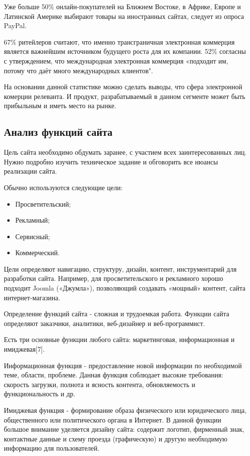Уже больше 50\% онлайн-покупателей на Ближнем Востоке, в Африке, Европе и Латинской Америке выбирают товары на иностранных сайтах, следует из опроса PayPal.

67\% ритейлеров считают, что именно трансграничная электронная коммерция является важнейшим источником будущего роста для их компании.
52\% согласны с утверждением, что международная электронная коммерция «подходит им, потому что даёт много международных клиентов".

На основании данной статистике можно сделать выводы, что сфера электронной комерции релеванта.
И продукт, разрабатываемый в данном сегменте может быть прибыльным и иметь место на рынке.

\subsection{Анализ функций сайта}
Цель сайта необходимо обдумать заранее, с участием всех заинтересованных лиц.
Нужно подробно изучить техническое задание и обговорить все нюансы реализации сайта.

Обычно используются следующие цели:
\begin{itemize}
  \item Просветительский;
  \item Рекламный;
  \item Сервисный;
  \item Коммерческий.
\end{itemize}

Цели определяют навигацию, структуру, дизайн, контент, инструментарий для разработки сайта.
Например, для просветительского и рекламного хорошо подходит Joomla («Джумла»), позволяющий создавать «мощный» контент, сайта интернет-магазина.

Определение функций сайта - сложная и трудоемкая работа.
Функции сайта определяют заказчики, аналитики, веб-дизайнер и веб-программист.

Есть три основные функции любого сайта: маркетинговая, информационная и имиджевая[7].

Информационная функция - предоставление новой информации по необходимой теме, области, проблеме.
Данная функция соблюдает высокие требования: скорость загрузки, полнота и ясность контента, обновляемость и функциональность и др.

Имиджевая функция - формирование образа физического или юридического лица, общественного или политического органа в Интернет.
В данной функции большое внимание уделяется дизайну сайта: содержит логотип, фирменный знак, контактные данные и схему проезда (графическую) и другую необходимую информацию для пользователей.

